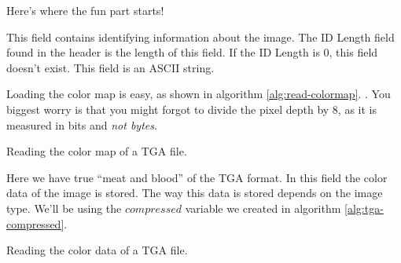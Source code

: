 \begin{refsection}
  Here's where the fun part starts!


  This field contains identifying information about the image. The
  ID Length field found in the header is the length of this field. If
  the ID Length is 0, this field doesn't exist. This field is an ASCII
  string.


  Loading the color map is easy, as shown in algorithm
  \ref{alg:read-colormap}. . You
  biggest worry is that you might forgot to divide the pixel depth by
  8, as it is measured in bits and \textit{not bytes}.

  \begin{algorithm}[H]
    \caption{Reading the color map of a TGA file.}
    \label{alg:read-colormap}
    \begin{algorithmic}[1]
      \EndFor
    \end{algorithmic}
  \end{algorithm}


  Here we have true ``meat and blood'' of the TGA format. In this
  field the color data of the image is stored. The way this data is
  stored depends on the image type. We'll be using the $compressed$
  variable we created in algorithm \ref{alg:tga-compressed}.

  \begin{algorithm}[H]
    \caption{Reading the color data of a TGA file.}
    \label{alg:TGA-read-colordata}
    \newcommand{\process}{\State Process the color $data$ \dots}
    \begin{algorithmic}[1]




            \EndIf



\end{algorithmic}
\end{algorithm}
\end{refsection}
